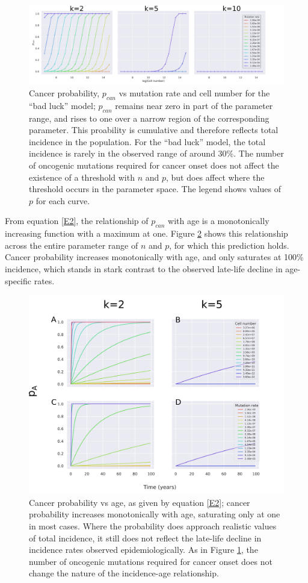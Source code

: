 \documentclass[9pt,twocolumn,twoside]{pnas-new}
\begin{document}
\begin{figure}[tbhp]
	\centering
	\includegraphics[width=.8\linewidth]{fig1.png}
	\caption{Cancer probability, $p_{can}$ vs mutation rate and cell number for the ``bad luck'' model; $p_{can}$ remains near zero in part of the parameter range, and rises to one over a narrow region of the corresponding parameter. This proability is cumulative and therefore reflects total incidence in the population. For the ``bad luck'' model, the total incidence is rarely in the observed range of around 30\%. The number of oncogenic mutations required for cancer onset does not affect the existence of a threshold with $n$ and $p$, but does affect where the threshold occurs in the parameter space. The legend shows values of $p$ for each curve.}
	\label{fig1}
\end{figure}

From equation \ref{E2}, the relationship of $p_{can}$ with age is a monotonically increasing function with a maximum at one. Figure \ref{fig2} shows this relationship across the entire parameter range of $n$ and $p$, for which this prediction holds. Cancer probability increases monotonically with age, and only saturates at 100\% incidence, which stands in stark contrast to the observed late-life decline in age-specific rates.

\begin{figure}[tbhp]
	\centering
	\includegraphics[width=.8\linewidth]{fig2.png}
	\caption{Cancer probability vs age, as given by equation \ref{E2}; cancer probability increases monotonically with age, saturating only at one in most cases. Where the probability does approach realistic values of total incidence, it still does not reflect the late-life decline in incidence rates observed epidemiologically. As in Figure \ref{fig1}, the number of oncogenic mutations required for cancer onset does not change the nature of the incidence-age relationship.}
	\label{fig2}
\end{figure}
\end{document}
